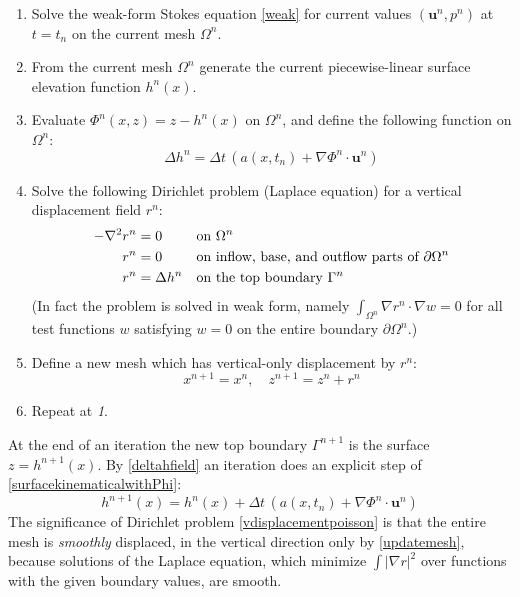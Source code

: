 \documentclass[letterpaper,final,12pt,reqno]{amsart}
\newcommand{\grad}{\nabla}
\newcommand{\bu}{\mathbf{u}}
\begin{document}
\medskip
\renewcommand{\labelenumi}{\emph{\arabic{enumi}.}}
\begin{enumerate}
\item Solve the weak-form Stokes equation \eqref{weak} for current values $(\bu^n,p^n)$ at $t=t_n$ on the current mesh $\Omega^n$.
\item From the current mesh $\Omega^n$ generate the current piecewise-linear surface elevation function $h^n(x)$.
\item Evaluate $\Phi^n(x,z) = z - h^n(x)$ on $\Omega^n$, and define the following function on $\Omega^n$:
\begin{equation}
\Delta h^n =  \Delta t\,\left(a(x,t_n) + \grad \Phi^n\cdot \bu^n\right) \label{deltahfield}
\end{equation}
\item Solve the following Dirichlet problem (Laplace equation) for a vertical displacement field $r^n$:
\begin{align}
- \grad^2 r^n &= 0 & &\text{on } \Omega^n \label{vdisplacementpoisson} \\
          r^n &= 0 & &\text{on inflow, base, and outflow parts of } \partial \Omega^n \notag \\
          r^n &= \Delta h^n & &\text{on the top boundary } \Gamma^n \notag
\end{align}
(In fact the problem is solved in weak form, namely $\int_{\Omega^n} \grad r^n\cdot \grad w = 0$ for all test functions $w$ satisfying $w=0$ on the entire boundary $\partial \Omega^n$.)
\item Define a new mesh which has vertical-only displacement by $r^n$:
\begin{equation}
  x^{n+1} = x^n, \quad z^{n+1} = z^n + r^n \label{updatemesh}
\end{equation}
\item Repeat at \emph{1}.
\end{enumerate}

\medskip
At the end of an iteration the new top boundary $\Gamma^{n+1}$ is the surface $z=h^{n+1}(x)$.  By \eqref{deltahfield} an iteration does an explicit step of \eqref{surfacekinematicalwithPhi}:
    $$h^{n+1}(x) = h^n(x) + \Delta t\,\left(a(x,t_n) + \grad \Phi^n\cdot \bu^n\right)$$
The significance of Dirichlet problem \eqref{vdisplacementpoisson} is that the entire mesh is \emph{smoothly} displaced, in the vertical direction only by \eqref{updatemesh}, because solutions of the Laplace equation, which minimize $\int |\grad r|^2$ over functions with the given boundary values, are smooth.
\end{document}
